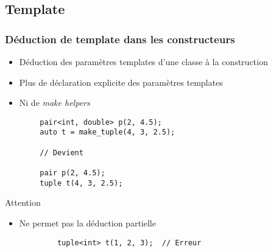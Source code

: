 \documentclass[C++.tex]{subfiles}
\begin{document}
\subsection*{Template}
\begin{frame}[fragile]
	\frametitle{Déduction de template dans les constructeurs}
	\begin{itemize}
		\item Déduction des paramètres templates d'une classe à la construction
		\item Plus de déclaration explicite des paramètres templates
		\item Ni de \textit{make helpers}
	\end{itemize}


	\begin{verbatim}
		pair<int, double> p(2, 4.5);
		auto t = make_tuple(4, 3, 2.5);

		// Devient

		pair p(2, 4.5);
		tuple t(4, 3, 2.5);
	\end{verbatim}

	\begin{alertblock}{Attention}
		\begin{itemize}
			\item Ne permet pas la déduction partielle
		\end{itemize}

		\begin{verbatim}
			tuple<int> t(1, 2, 3);  // Erreur
		\end{verbatim}
	\end{alertblock}


\end{frame}
\end{document}
